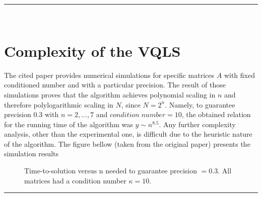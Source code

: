 \documentclass[12pt]{article}
\begin{document}
{\raggedleft
\rule{\textwidth}{.5pt}}\\
\section*{{\bf Complexity of the VQLS}}
The cited paper provides numerical simulations for specific matrices $A$ with fixed conditioned number and with a particular precision. The result of those simulations proves that the algorithm achieves polynomial scaling in $n$ and therefore polylogarithmic scaling in $N$, since $N=2^n$.
Namely, to guarantee precision 0.3 with $n = 2, ..., 7$ and $condition\;number =10$, the obtained relation for the running time of the algorithm was $y \sim n^{8.5}$. Any further complexity analysis, other than the experimental one, is difficult due to the heuristic nature of the algorithm. The figure bellow (taken from the original paper) presents the simulation results 
\begin{figure}[H]
    
    \caption{
        \justifying
        Time-to-solution versus n needed to guarantee precision $= 0.3$. All matrices had a condition number $\kappa = 10$.}
\end{figure}
{\raggedleft
\rule{\textwidth}{.5pt}}\\
\end{document}
